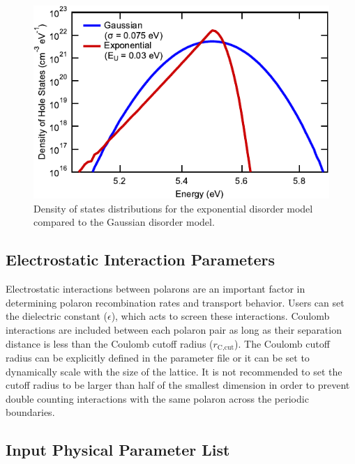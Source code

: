\documentclass[%
 reprint,onecolumn,notitlepage,
superscriptaddress,longbibliography,
 amsmath,amssymb,
 aps,rmp,floatfix,
]{revtex4-1}
\begin{document}
\begin{figure}[h]
    \centering
    \includegraphics{DOS_shape_comparison.pdf}
    \caption{Density of states distributions for the exponential disorder model compared to the Gaussian disorder model.}
    \label{fig:exponential_dos}
\end{figure}

\subsection{Electrostatic Interaction Parameters}

Electrostatic interactions between polarons are an important factor in determining polaron recombination rates\cite{heiber2016prb} and transport behavior\cite{vanderholst2011prb}.
Users can set the dielectric constant ($\epsilon$), which acts to screen these interactions.
Coulomb interactions are included between each polaron pair as long as their separation distance is less than the Coulomb cutoff radius ($r_{\text{C,cut}}$).
The Coulomb cutoff radius can be explicitly defined in the parameter file or it can be set to dynamically scale with the size of the lattice.
It is not recommended to set the cutoff radius to be larger than half of the smallest dimension in order to prevent double counting interactions with the same polaron across the periodic boundaries.

\subsection{Input Physical Parameter List}
\end{document}
